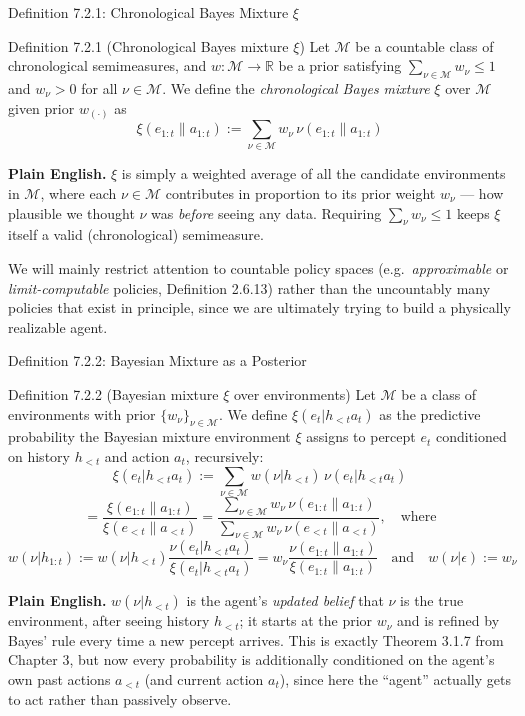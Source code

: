 \documentclass[aspectratio=169,10pt]{beamer}
\newcommand{\R}{\mathbb{R}}
\newcommand{\Mcal}{\mathcal{M}}
\begin{document}
\begin{frame}{Definition 7.2.1: Chronological Bayes Mixture $\xi$}
  \begin{block}{Definition 7.2.1 (Chronological Bayes mixture $\xi$)}
    Let $\Mcal$ be a countable class of chronological semimeasures, and
    $w:\Mcal\to\R$ be a prior satisfying $\sum_{\nu\in\Mcal}w_\nu\le 1$ and
    $w_\nu>0$ for all $\nu\in\Mcal$. We define the \emph{chronological Bayes
    mixture} $\xi$ over $\Mcal$ given prior $w_{(\cdot)}$ as
    \[
      \xi(e_{1:t}\|a_{1:t}) := \sum_{\nu\in\Mcal} w_\nu\,\nu(e_{1:t}\|a_{1:t})
    \]
  \end{block}
  \textbf{Plain English.} $\xi$ is simply a weighted average of all the
  candidate environments in $\Mcal$, where each $\nu\in\Mcal$ contributes in
  proportion to its prior weight $w_\nu$ --- how plausible we thought $\nu$
  was \emph{before} seeing any data. Requiring $\sum_\nu w_\nu\le 1$ keeps
  $\xi$ itself a valid (chronological) semimeasure.

  \vspace{2mm}
  We will mainly restrict attention to countable policy spaces (e.g.\
  \emph{approximable} or \emph{limit-computable} policies, Definition
  2.6.13) rather than the uncountably many policies that exist in
  principle, since we are ultimately trying to build a physically
  realizable agent.
\end{frame}

\begin{frame}{Definition 7.2.2: Bayesian Mixture as a Posterior}
  \begin{block}{Definition 7.2.2 (Bayesian mixture $\xi$ over environments)}
    Let $\Mcal$ be a class of environments with prior $\{w_\nu\}_{\nu\in\Mcal}$.
    We define $\xi(e_t|h_{<t}a_t)$ as the predictive probability the
    Bayesian mixture environment $\xi$ assigns to percept $e_t$ conditioned
    on history $h_{<t}$ and action $a_t$, recursively:
    \[
      \xi(e_t|h_{<t}a_t) := \sum_{\nu\in\Mcal} w(\nu|h_{<t})\,\nu(e_t|h_{<t}a_t)
    \]
    \[
      = \frac{\xi(e_{1:t}\|a_{1:t})}{\xi(e_{<t}\|a_{<t})}
      = \frac{\sum_{\nu\in\Mcal}w_\nu\,\nu(e_{1:t}\|a_{1:t})}
             {\sum_{\nu\in\Mcal}w_\nu\,\nu(e_{<t}\|a_{<t})},\quad\text{where}
    \]
    \[
      w(\nu|h_{1:t}) := w(\nu|h_{<t})\frac{\nu(e_t|h_{<t}a_t)}{\xi(e_t|h_{<t}a_t)}
      = w_\nu\frac{\nu(e_{1:t}\|a_{1:t})}{\xi(e_{1:t}\|a_{1:t})}
      \quad\text{and}\quad w(\nu|\epsilon):=w_\nu
    \]
  \end{block}
  \textbf{Plain English.} $w(\nu|h_{<t})$ is the agent's \emph{updated
  belief} that $\nu$ is the true environment, after seeing history
  $h_{<t}$; it starts at the prior $w_\nu$ and is refined by Bayes' rule
  every time a new percept arrives. This is exactly Theorem 3.1.7 from
  Chapter 3, but now every probability is additionally conditioned on the
  agent's own past actions $a_{<t}$ (and current action $a_t$), since here
  the ``agent'' actually gets to act rather than passively observe.
\end{frame}
\end{document}
